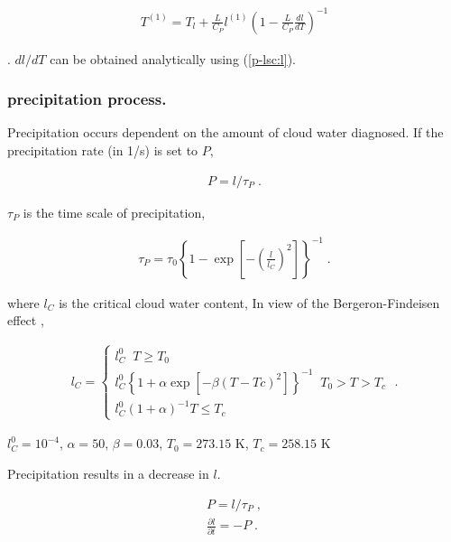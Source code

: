\begin{eqnarray}
  T^{(1)} = T_l +  \frac{L}{C_P} l^{(1)} 
                   \left( 1 - \frac{L}{C_P} \frac{dl}{dT} \right)^{-1}
\end{eqnarray}

. \(dl/dT\) can be obtained analytically using
({[}\protect\hyperlink{p-lsc:l}{p-lsc:l{]}}).

\hypertarget{precipitation-process.}{%
\subsubsection{precipitation process.}\label{precipitation-process.}}

Precipitation occurs dependent on the amount of cloud water diagnosed.
If the precipitation rate (in 1/s) is set to \(P\),

\begin{eqnarray}
  P = l / \tau_P \; .
\end{eqnarray}

\(\tau_P\) is the time scale of precipitation,

\begin{eqnarray}
  \tau_P  = \tau_0 \left\{ 1 - \exp\left[ - \left(\frac{l}{l_C}\right)^2  
                                   \right]  \right\}^{-1} \; .
\end{eqnarray}

where \(l_C\) is the critical cloud water content, In view of the
Bergeron-Findeisen effect ,

\begin{eqnarray}
  l_C = \left\{ 
        \begin{array}{ll}
          l_C^0 \; \;  T \ge T_0 \\
          l_C^0 \left\{ 1+\alpha \exp\left[ - \beta(T-Tc)^2 \right] 
                \right\}^{-1}\; \; 
                       T_0 > T >  T_c \\
          l_C^0 ( 1+\alpha )^{-1}
                       T \le T_c
        \end{array}
        \right. \; .
\end{eqnarray}

\(l_C^0=10^{-4}\), \(\alpha=50\), \(\beta=0.03\), \(T_0=273.15\) K,
\(T_c=258.15\) K

Precipitation results in a decrease in \(l\).

\begin{eqnarray}
  P          =  l / \tau_P \; , \\
  \frac{\partial l}{\partial t}  =  -P \; .
\end{eqnarray}

